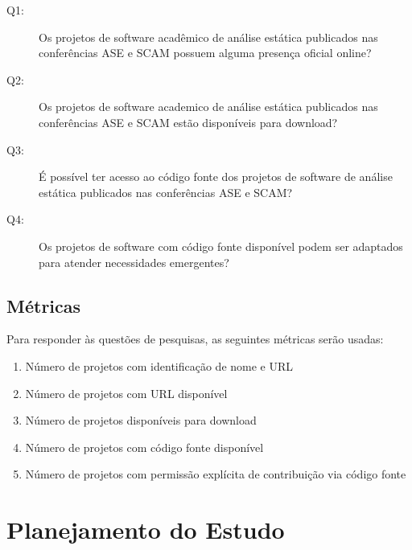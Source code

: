 \newcommand{\EstudoUmQuestaoUm}{
  Os projetos de software acadêmico de análise estática publicados nas
  conferências ASE e SCAM possuem alguma presença oficial online?
}
\newcommand{\EstudoUmQuestaoDois}{
  Os projetos de software academico de análise estática publicados nas
  conferências ASE e SCAM estão disponíveis para download?
}
\newcommand{\EstudoUmQuestaoTres}{
  É possível ter acesso ao código fonte dos projetos de software de análise
  estática publicados nas conferências ASE e SCAM?
}
\newcommand{\EstudoUmQuestaoQuatro}{
  Os projetos de software com código fonte disponível podem ser adaptados para
  atender necessidades emergentes?
}

\begin{description}
  \item [Q1:] \EstudoUmQuestaoUm
  \item [Q2:] \EstudoUmQuestaoDois
  \item [Q3:] \EstudoUmQuestaoTres
  \item [Q4:] \EstudoUmQuestaoQuatro
\end{description}

\subsection{Métricas}

Para responder às questões de pesquisas, as seguintes métricas serão usadas:

\begin{enumerate}
  \item Número de projetos com identificação de nome e URL
  \item Número de projetos com URL disponível
  \item Número de projetos disponíveis para download
  \item Número de projetos com código fonte disponível
  \item Número de projetos com permissão explícita de contribuição via código fonte
\end{enumerate}


\section{Planejamento do Estudo} \label{estudo1:planejamento} %

